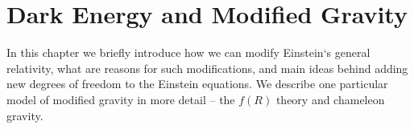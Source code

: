 \chapter{Dark Energy and Modified Gravity}
\label{chpt:de_mg}
In this chapter we briefly introduce how we can modify Einstein`s general relativity, what are reasons for such modifications, and main ideas behind adding new degrees of freedom to the Einstein equations. We describe one particular model of modified gravity in more detail -- the $f(R)$ theory and chameleon gravity.







